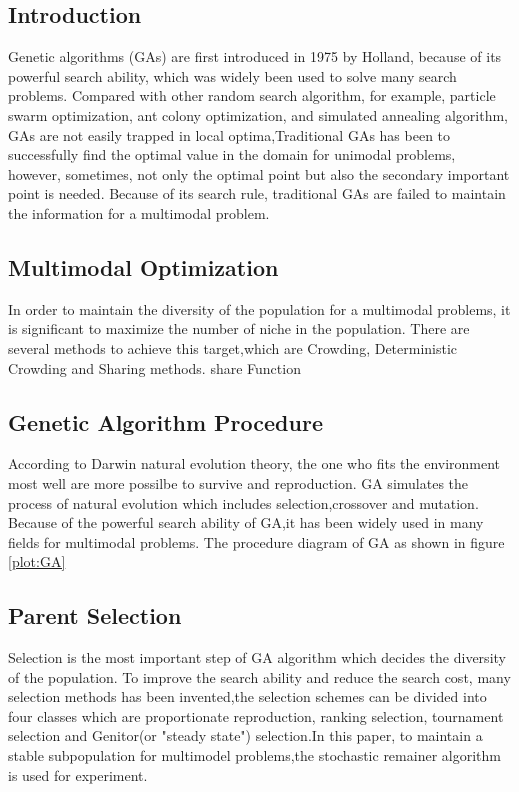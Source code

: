 \documentclass[smallextended]{svjour3}       %
\begin{document}
\begin{multicols}{2}

\section{Introduction}
Genetic algorithms (GAs) are first introduced in 1975 by Holland\cite{sampson1976adaptation}, because
of its powerful search ability, which was widely been used to solve many search problems. Compared with
other random search algorithm, for example, particle swarm optimization, ant colony optimization, and 
simulated annealing algorithm\cite{zabinsky2010random}, GAs are not easily trapped in local optima,Traditional
GAs has been to successfully find the optimal value in the domain for unimodal problems, however,
sometimes, not only the optimal point but also the secondary important point is needed. Because of its
search rule, traditional GAs are failed to maintain the information for a multimodal problem.

\subsection{Multimodal Optimization}
In order to maintain the diversity of the population for a multimodal problems, it is significant to
maximize the number of niche in the population. There are several methods to achieve this target,which
are Crowding, Deterministic Crowding and Sharing methods.
share Function\cite{goldberg1987genetic}

\subsection{Genetic Algorithm Procedure}
According to Darwin natural evolution theory, the one who fits the environment most well are more 
possilbe to survive and reproduction. GA simulates the process of natural evolution which includes 
selection,crossover and mutation. Because of the powerful search ability of GA,it has been widely 
used in many fields for multimodal problems. The procedure diagram of GA as shown in figure \ref{plot:GA} 
 
\subsection{Parent Selection}
Selection is the most important step of GA algorithm which decides the diversity of the population.
To improve the search ability and reduce the search cost, many selection methods \cite{goldberg1991comparative}
has been invented,the selection schemes can be divided into four classes which are proportionate reproduction,
ranking selection, tournament selection and Genitor(or "steady state") selection.In this paper, to maintain a 
stable subpopulation
for multimodel problems,the stochastic remainer algorithm is used for experiment.


\end{multicols}
\end{document}

